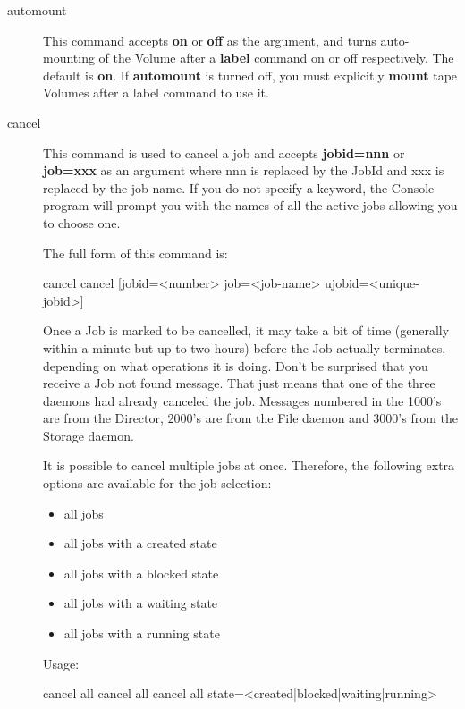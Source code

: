 \begin{description}
\item [automount]
   This command accepts {\bf on} or {\bf off} as the argument, and turns
   auto-mounting of the Volume after a {\bf label} command on or off
   respectively.  The default is {\bf on}.  If {\bf automount} is turned
   off, you must explicitly {\bf mount} tape Volumes after a label command to
   use it.

\item [cancel]
   This command is used to cancel a job and accepts {\bf jobid=nnn} or {\bf
   job=xxx} as an argument where nnn is replaced by the JobId and xxx is
   replaced by the job name.  If you do not specify a keyword, the Console
   program will prompt you with the names of all the active jobs allowing
   you to choose one.

   The full form of this command is:

\begin{bconsole}{cancel}
cancel [jobid=<number> job=<job-name> ujobid=<unique-jobid>]
\end{bconsole}

   Once a Job is marked to be cancelled, it may take a bit of time
   (generally within a minute but up to two hours) before the Job actually
   terminates, depending on what operations it is doing.
   Don't be surprised that you receive a Job not found message. That just
   means that one of the three daemons had already canceled the job.
   Messages numbered in the 1000's are from the Director, 2000's are from
   the File daemon and 3000's from the Storage daemon.

   It is possible to cancel multiple jobs at once. Therefore, the following extra options are available for the job-selection:

   \begin{itemize}
    \item all jobs
    \item all jobs with a created state
    \item all jobs with a blocked state
    \item all jobs with a waiting state
    \item all jobs with a running state
   \end{itemize}

   Usage:
\begin{bconsole}{cancel all}
cancel all
cancel all state=<created|blocked|waiting|running>
\end{bconsole}


\end{description}
